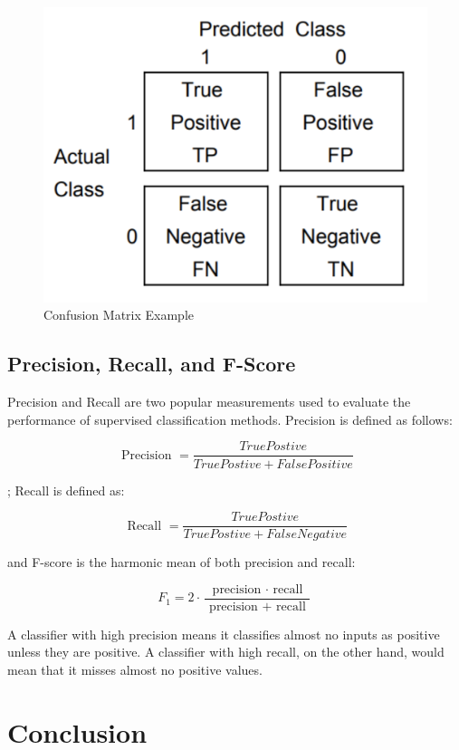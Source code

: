 \begin{figure}[hbtp]
\caption{Confusion Matrix Example}
\includegraphics[scale=.5]{../Figures/Confuse_Mat_Example.png}\centering
\end{figure}

\subsection{Precision, Recall, and F-Score}

Precision and Recall are two popular measurements used to evaluate the performance of supervised classification methods. Precision is defined as follows:

$$\text { Precision } = \frac { True Postive } { True Postive + False Positive }$$

; Recall is defined as:

$$\text { Recall } = \frac { True Postive } { True Postive + False Negative }$$

and F-score is the harmonic mean of both precision and recall:

$$F _ { 1 } = 2 \cdot \frac { \text { precision } \cdot \text { recall } } { \text { precision } + \text { recall } }$$

A classifier with high precision means it classifies almost no inputs as positive unless they are positive. A classifier with high recall, on the other hand, would mean that  it misses almost no positive values. 
\section{Conclusion}

